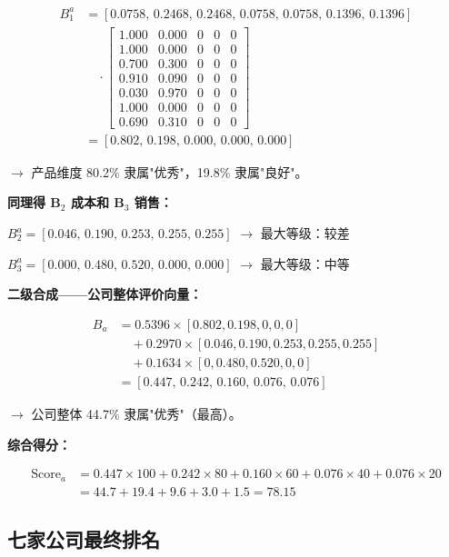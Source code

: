 \documentclass[a4paper,11pt]{ctexart}
\begin{document}
\begin{align*}
B_1^{a} &= [0.0758,\,0.2468,\,0.2468,\,0.0758,\,0.0758,\,0.1396,\,0.1396] \\
        &\quad \cdot
        \begin{bmatrix}
        1.000 & 0.000 & 0 & 0 & 0 \\
        1.000 & 0.000 & 0 & 0 & 0 \\
        0.700 & 0.300 & 0 & 0 & 0 \\
        0.910 & 0.090 & 0 & 0 & 0 \\
        0.030 & 0.970 & 0 & 0 & 0 \\
        1.000 & 0.000 & 0 & 0 & 0 \\
        0.690 & 0.310 & 0 & 0 & 0
        \end{bmatrix} \\
        &= [0.802,\,0.198,\,0.000,\,0.000,\,0.000]
\end{align*}

$\to$ 产品维度 80.2\% 隶属"优秀"，19.8\% 隶属"良好"。

\textbf{同理得 B$_2$ 成本和 B$_3$ 销售：}

$B_2^a = [0.046,\,0.190,\,0.253,\,0.255,\,0.255]$ $\to$ 最大等级：较差

$B_3^a = [0.000,\,0.480,\,0.520,\,0.000,\,0.000]$ $\to$ 最大等级：中等

\textbf{二级合成——公司整体评价向量：}

\begin{align*}
B_a &= 0.5396 \times [0.802,0.198,0,0,0] \\
    &\quad + 0.2970 \times [0.046,0.190,0.253,0.255,0.255] \\
    &\quad + 0.1634 \times [0,0.480,0.520,0,0] \\
    &= [0.447,\,0.242,\,0.160,\,0.076,\,0.076]
\end{align*}

$\to$ 公司整体 44.7\% 隶属"优秀"（最高）。

\textbf{综合得分：}

\begin{align*}
\text{Score}_a &= 0.447 \times 100 + 0.242 \times 80 + 0.160 \times 60 + 0.076 \times 40 + 0.076 \times 20 \\
               &= 44.7 + 19.4 + 9.6 + 3.0 + 1.5 = \mathbf{78.15}
\end{align*}

\subsection{七家公司最终排名}
\end{document}
